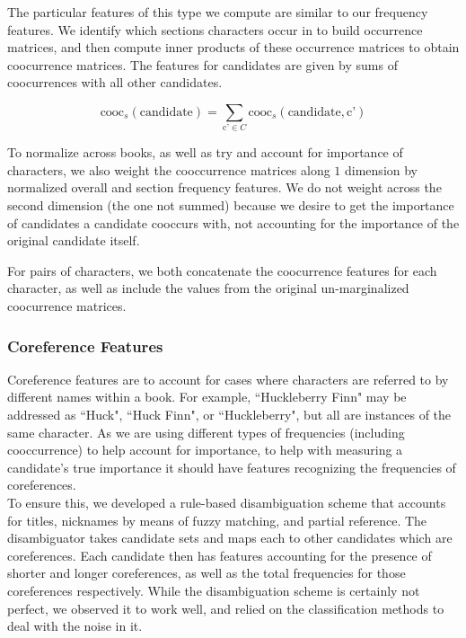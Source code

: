 \documentclass[12pt]{article}
\begin{document}
        The particular features of this type we compute are similar to our frequency features. We identify
        which sections characters occur in to build occurrence matrices, and then compute inner products
        of these occurrence matrices to obtain coocurrence matrices. The features for candidates are
        given by sums of coocurrences with all other candidates. 

        \[\mbox{cooc}_s(\mbox{candidate}) = \sum_{\mbox{c'} \in C} \mbox{cooc}_s(\mbox{candidate}, \mbox{c'})\]

        To normalize across books, as well as try and account for importance of characters, we also
        weight the cooccurrence matrices along $1$ dimension by normalized overall and section frequency
        features. We do not weight across the second dimension (the one not summed) because we desire to
        get the importance of candidates a candidate cooccurs with, not accounting for the importance
        of the original candidate itself.


        For pairs of characters, we both concatenate the coocurrence features for each character, as well
        as include the values from the original un-marginalized coocurrence matrices.

        \subsubsection{Coreference Features}
        
        Coreference features are to account for cases where characters are referred to by different 
        names within a book. For example, ``Huckleberry Finn" may be addressed as ``Huck", ``Huck Finn",
        or ``Huckleberry", but all are instances of the same character. As we are using different
        types of frequencies (including cooccurrence) to help account for importance, to help
        with measuring a candidate's true importance it should have features recognizing the 
        frequencies of coreferences. \\

        To ensure this, we developed a rule-based disambiguation scheme that accounts for titles,
        nicknames by means of fuzzy matching, and partial reference. The disambiguator takes
        candidate sets and maps each to other candidates which are coreferences. Each candidate then has
        features accounting for the presence of shorter and longer coreferences, as well as
        the total frequencies for those coreferences respectively. While the disambiguation
        scheme is certainly not perfect, we observed it to work well, and relied on the classification
        methods to deal with the noise in it.
\end{document}
